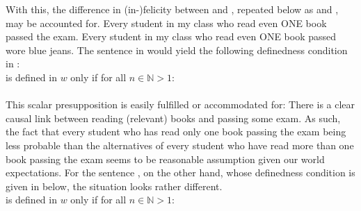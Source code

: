 With this, the difference in (in-)felicity between  and , repeated below as  and , may be accounted for.
\pex
\a Every student in my class who read even \MakeUppercase{one} book passed the exam.
\a\ljudge{\#}Every student in my class who read even \MakeUppercase{one} book passed wore blue jeans.
\xe
The sentence in  would yield the following definedness condition in :
\ex
{}\\is defined in $w$ only if for all $n\in\mathbb{N}>1$:\\\\
\xe
This scalar presupposition is easily fulfilled or accommodated for: There is a clear causal link between reading (relevant) books and passing some exam. As such, the fact that every student who has read only one book passing the exam being less probable than the alternatives of every student who have read more than one book passing the exam seems to be reasonable assumption given our world expectations. For the sentence , on the other hand, whose definedness condition is given in  below, the situation looks rather different.
\ex
{}\\is defined in $w$ only if for all $n\in\mathbb{N}>1$:\\\\
